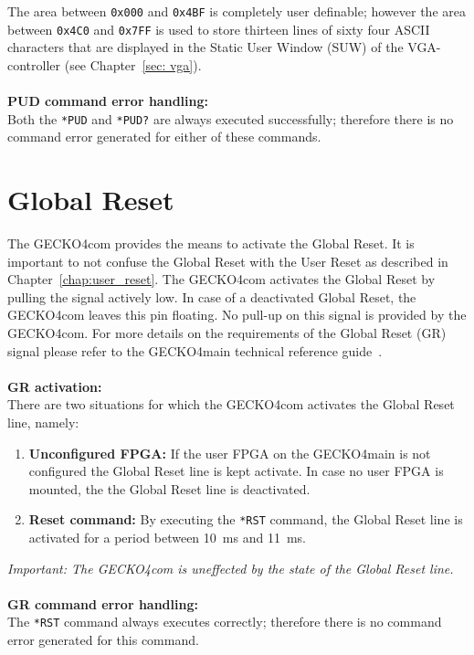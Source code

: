 The area between \verb+0x000+ and \verb+0x4BF+ is completely user definable;
however the area between \verb+0x4C0+ and \verb+0x7FF+ is used to store thirteen
lines of sixty four ASCII characters that are displayed in the Static User Window
 (SUW) of the VGA-controller (see Chapter~\ref{sec: vga}).\\
  \\
\textbf{PUD command error handling:}\\
Both the \verb+*PUD+ and \verb+*PUD?+ are always executed successfully; therefore
there is no command error generated for either of these commands.
\section{Global Reset}
The {\sc GECKO4com} provides the means to activate the Global Reset. It is
important to not confuse the Global Reset with the User Reset as described in
Chapter~\ref{chap:user_reset}. The {\sc GECKO4com} activates the Global Reset by
pulling the signal actively low. In case of a deactivated Global Reset, the
{\sc GECKO4com} leaves this pin floating. No pull-up on this signal is provided
by the {\sc GECKO4com}. For more details on the requirements of the Global Reset
(GR) signal please refer to the {\sc GECKO4main} technical reference
guide~\cite{gecko4main}.\\
 \\
\textbf{GR activation:}\\
There are two situations for which the {\sc GECKO4com} activates the Global
Reset line, namely:
\begin{enumerate}
\item \textbf{Unconfigured FPGA:} If the user FPGA on the {\sc GECKO4main} is
not configured the Global Reset line is kept activate.
In case no user FPGA is mounted, the the Global Reset line is deactivated.
\item \textbf{Reset command:} By executing the \verb+*RST+ command, the Global
Reset line is activated for a period between 10~ms and 11~ms.
\end{enumerate}
\textit{Important: The {\sc GECKO4com} is uneffected by the state of the Global Reset
line.\important}\\
 \\
\textbf{GR command error handling:}\\
The \verb+*RST+ command always executes correctly; therefore there is no command
error generated for this command.
